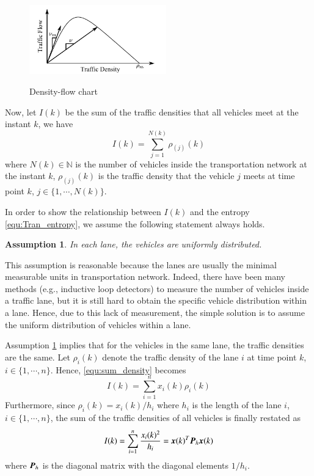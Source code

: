 \documentclass[preprint,authoryear,12pt]{elsarticle}
\renewcommand{\vec}[1]{\mbox{\boldmath$#1$}}
\newcommand{\mat}[1]{\mbox{\boldmath$#1$}}
\newtheorem{ass}{Assumption}
\begin{document}
\begin{figure}[ht]
  \centering
  \includegraphics[height=3cm]{pics/d-q}\\
  \caption{Density-flow chart}
  \label{fig:d_q}
\end{figure}

Now, let $I(k)$ be the sum of the traffic densities that all vehicles
meet at the instant $k$, we have
\begin{equation}
\label{equ:sum_density}
I(k)=\sum_{j=1}^{N(k)} \rho_{(j)}(k)
\end{equation}
where $N(k)\in\mathbb{N}$ is the number of vehicles inside the
transportation network at the instant $k$, $\rho_{(j)}(k)$ is the
traffic density that the vehicle $j$ meets at time point $k$,
$j\in\{1,\cdots,N(k)\}$.

In order to show the relationship between $I(k)$ and the entropy
\eqref{equ:Tran_entropy}, we assume the following statement always
holds.
\begin{ass}\label{ass:distribution}
In each lane, the vehicles are uniformly distributed.
\end{ass}
This assumption is reasonable because the lanes are usually the
minimal measurable units in transportation network. Indeed, there
have been many methods (e.g., inductive loop detectors) to measure
the number of vehicles inside a traffic lane, but it is still hard to
obtain the specific vehicle distribution within a lane. Hence, due to
this lack of measurement, the simple solution is to assume the
uniform distribution of vehicles within a lane.

Assumption \ref{ass:distribution} implies that for the vehicles in
the same lane, the traffic densities are the same. Let $\rho_i(k)$
denote the traffic density of the lane $i$ at time point $k$, $i\in
\{1,\cdots,n\}$. Hence, \eqref{equ:sum_density} becomes
$$I(k)=\sum_{i=1}^{n} x_i(k)\rho_i(k)$$
Furthermore, since $\rho_i(k)=x_i(k)/h_i$ where $h_i$ is the length
of the lane $i$, $i\in \{1,\cdots,n\}$, the sum of the traffic
densities of all vehicles is finally restated as
\begin{equation}
\label{equ:quality_service}
I(k)=\sum_{i=1}^{n}
\frac{x_i(k)^2}{h_i}=\vec{x}(k)^T\mat{P}_h\vec{x}(k)
\end{equation}
where $\mat{P}_h$ is the diagonal matrix with the diagonal elements
$1/h_i$.
\end{document}
